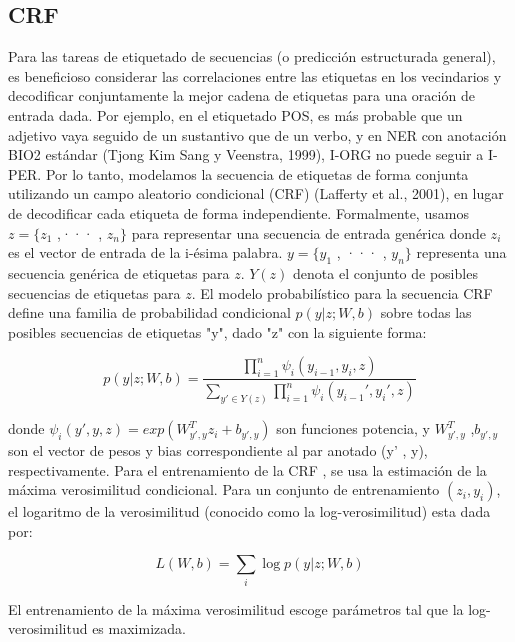 \documentclass[runningheads]{llncs}
\begin{document}
\subsection{CRF}

Para las tareas de etiquetado de secuencias (o predicción estructurada general), es beneficioso 
considerar las correlaciones entre las etiquetas en los vecindarios y decodificar conjuntamente 
la mejor cadena de etiquetas para una oración de entrada dada. Por ejemplo, en el etiquetado POS, 
es más probable que un adjetivo vaya seguido de un sustantivo que de un verbo, y en NER con anotación 
BIO2 estándar (Tjong Kim Sang y Veenstra, 1999), I-ORG no puede seguir a I-PER. Por lo tanto, 
modelamos la secuencia de etiquetas de forma conjunta utilizando un campo aleatorio condicional 
(CRF) (Lafferty et al., 2001), en lugar de decodificar cada etiqueta de forma independiente. 
Formalmente, usamos $z = \{z_{1}$ ,··· , $z_{n} \}$ para representar una secuencia de entrada 
genérica donde $z_{i}$ es el vector de entrada de la i-ésima palabra. $y = \{y_{1}$ , ··· , $y_n \}$ 
representa una secuencia genérica de etiquetas para $z$. $Y(z)$ denota el conjunto de posibles 
secuencias de etiquetas para $z$. El modelo probabilístico para la secuencia CRF define una 
familia de probabilidad condicional $p(y|z; W, b)$ sobre todas las posibles secuencias de 
etiquetas "y", dado "z" con la siguiente forma:

\begin{equation}
	p(y|z; W, b) =  \frac {\prod_{i=1}^{n} \psi_{i} (y_{i-1}, y_{i} ,z)}
	{\sum_{y' \in Y(z)} \prod_{i=1}^{n} \psi_{i} (y_{i-1}', y_{i}' , z)}
\end{equation}

donde $\psi_{i}(y',y, z) = exp(W_{y',y}^{T} z_{i}+ b_{y',y} )$ son funciones potencia, 
y $W_{y',y}^{T}$ ,$b_{y',y}$  son  el vector de pesos y bias correspondiente al par anotado 
(y' , y), respectivamente. Para el entrenamiento de la CRF , se usa la estimación de la máxima 
verosimilitud condicional. Para un conjunto de entrenamiento ${(z_{i} , y_{i} )}$, el 
logaritmo de la verosimilitud (conocido como la log-verosimilitud) esta dada por:

\begin{equation}
	L(W, b) =\sum_{i}{\log p(y|z; W, b)}
\end{equation}



El entrenamiento de la máxima verosimilitud escoge parámetros tal que la log-verosimilitud 
es maximizada.
\end{document}
